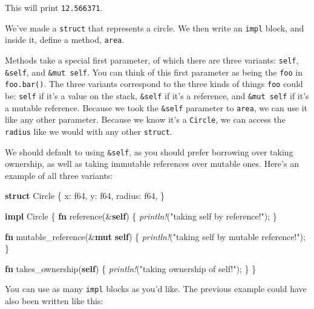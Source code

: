 \documentclass[a4paper,]{book}
\newenvironment{Shaded}{\begin{snugshade}}{\end{snugshade}}
\newcommand{\KeywordTok}[1]{\textcolor[rgb]{0.13,0.29,0.53}{\textbf{{#1}}}}
\newcommand{\DataTypeTok}[1]{\textcolor[rgb]{0.13,0.29,0.53}{{#1}}}
\newcommand{\StringTok}[1]{\textcolor[rgb]{0.31,0.60,0.02}{{#1}}}
\newcommand{\PreprocessorTok}[1]{\textcolor[rgb]{0.56,0.35,0.01}{\textit{{#1}}}}
\newcommand{\NormalTok}[1]{{#1}}
\begin{document}
This will print \texttt{12.566371}.

We've made a \texttt{struct} that represents a circle. We then write an
\texttt{impl} block, and inside it, define a method, \texttt{area}.

Methods take a special first parameter, of which there are three
variants: \texttt{self}, \texttt{\&self}, and \texttt{\&mut\ self}. You
can think of this first parameter as being the \texttt{foo} in
\texttt{foo.bar()}. The three variants correspond to the three kinds of
things \texttt{foo} could be: \texttt{self} if it's a value on the
stack, \texttt{\&self} if it's a reference, and \texttt{\&mut\ self} if
it's a mutable reference. Because we took the \texttt{\&self} parameter
to \texttt{area}, we can use it like any other parameter. Because we
know it's a \texttt{Circle}, we can access the \texttt{radius} like we
would with any other \texttt{struct}.

We should default to using \texttt{\&self}, as you should prefer
borrowing over taking ownership, as well as taking immutable references
over mutable ones. Here's an example of all three variants:

\begin{Shaded}
\begin{Highlighting}[]
\KeywordTok{struct} \NormalTok{Circle \{}
    \NormalTok{x: }\DataTypeTok{f64}\NormalTok{,}
    \NormalTok{y: }\DataTypeTok{f64}\NormalTok{,}
    \NormalTok{radius: }\DataTypeTok{f64}\NormalTok{,}
\NormalTok{\}}

\KeywordTok{impl} \NormalTok{Circle \{}
    \KeywordTok{fn} \NormalTok{reference(&}\KeywordTok{self}\NormalTok{) \{}
       \PreprocessorTok{println!}\NormalTok{(}\StringTok{"taking self by reference!"}\NormalTok{);}
    \NormalTok{\}}

    \KeywordTok{fn} \NormalTok{mutable_reference(&}\KeywordTok{mut} \KeywordTok{self}\NormalTok{) \{}
       \PreprocessorTok{println!}\NormalTok{(}\StringTok{"taking self by mutable reference!"}\NormalTok{);}
    \NormalTok{\}}

    \KeywordTok{fn} \NormalTok{takes_ownership(}\KeywordTok{self}\NormalTok{) \{}
       \PreprocessorTok{println!}\NormalTok{(}\StringTok{"taking ownership of self!"}\NormalTok{);}
    \NormalTok{\}}
\NormalTok{\}}
\end{Highlighting}
\end{Shaded}

You can use as many \texttt{impl} blocks as you'd like. The previous
example could have also been written like this:
\end{document}
